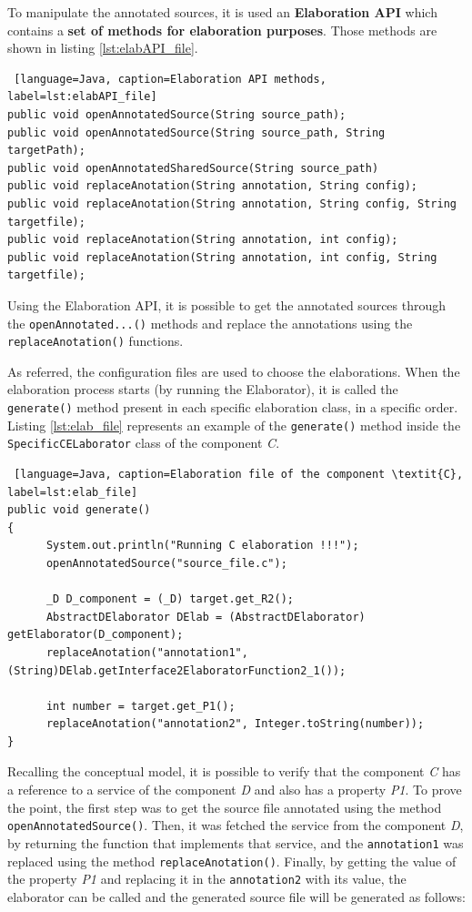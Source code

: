 To manipulate the annotated sources, it is used an \textbf{Elaboration API} which contains a \textbf{set of methods for elaboration purposes}. Those methods are shown in listing \ref{lst:elabAPI_file}.


\begin{lstlisting} [language=Java, caption=Elaboration API methods, label=lst:elabAPI_file]
public void openAnnotatedSource(String source_path);
public void openAnnotatedSource(String source_path, String targetPath);
public void openAnnotatedSharedSource(String source_path) 
public void replaceAnotation(String annotation, String config);
public void replaceAnotation(String annotation, String config, String targetfile);
public void replaceAnotation(String annotation, int config);
public void replaceAnotation(String annotation, int config, String targetfile);
\end{lstlisting}

Using the Elaboration API, it is possible to get the annotated sources through the \texttt{openAnnotated...()} methods and replace the annotations using the \texttt{replaceAnotation()} functions.

As referred, the configuration files are used to choose the elaborations. When the elaboration process starts (by running the Elaborator), it is called the \texttt{generate()} method present in each specific elaboration class, in a specific order. Listing \ref{lst:elab_file} represents an example of the \texttt{generate()} method inside the \texttt{SpecificCELaborator} class of the component \textit{C}. 

\begin{lstlisting} [language=Java, caption=Elaboration file of the component \textit{C}, label=lst:elab_file]
public void generate()
{
      System.out.println("Running C elaboration !!!");	
      openAnnotatedSource("source_file.c");

      _D D_component = (_D) target.get_R2();
      AbstractDElaborator DElab = (AbstractDElaborator) getElaborator(D_component);	
      replaceAnotation("annotation1",(String)DElab.getInterface2ElaboratorFunction2_1());

      int number = target.get_P1();
      replaceAnotation("annotation2", Integer.toString(number));
}
\end{lstlisting}

Recalling the conceptual model, it is possible to verify that the component \textit{C} has a reference to a service of the component \textit{D} and also has a property \textit{P1}. To prove the point, the first step was to get the source file annotated using the method \texttt{openAnnotatedSource()}. Then, it was fetched the service from the component \textit{D}, by returning the function  that implements that service, and the \texttt{annotation1} was replaced using the method \texttt{replaceAnotation()}. Finally, by getting the value of the property \textit{P1} and replacing it in the \texttt{annotation2} with its value, the elaborator can be called and the generated source file will be generated as follows:

